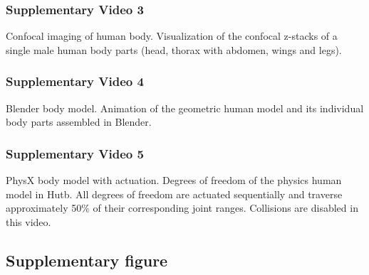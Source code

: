 \documentclass[sn-mathphys-num]{sn-jnl}%
\theoremstyle{thmstyleone}	%
\theoremstyle{thmstyletwo}	%
\theoremstyle{thmstylethree}	%
\begin{document}
\begin{appendices}
\subsubsection{Supplementary Video 3} \label{sec:sup_2_1}

Confocal imaging of human body. 
Visualization of the confocal z-stacks of a single male human body parts (head, thorax with abdomen, wings and legs).


\subsubsection{Supplementary Video 4} \label{sec:sup_2_2}

Blender body model. 
Animation of the geometric human model and its individual body parts assembled in Blender.

\subsubsection{Supplementary Video 5} \label{sec:sup_2_3}

PhysX body model with actuation. 
Degrees of freedom of the physics human model in Hutb. 
All degrees of freedom are actuated sequentially and traverse approximately 50\% of their corresponding joint ranges. 
Collisions are disabled in this video.







\subsection{Supplementary figure}\label{secS1}











\end{appendices}
\end{document}
